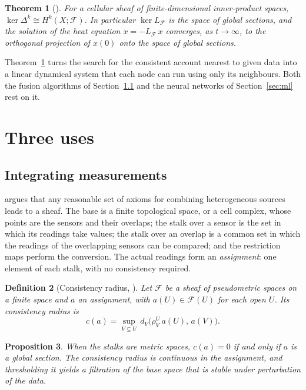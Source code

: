 \documentclass[11pt,a4paper,oneside]{scrartcl}
\theoremstyle{guideplain}
\newtheorem{theorem}{Theorem}[section]
\newtheorem{proposition}[theorem]{Proposition}
\theoremstyle{guidedef}
\newtheorem{definition}[theorem]{Definition}
\newcommand{\F}{\mathcal{F}}
\begin{document}
\begin{theorem}[\cite{hansen2019}]\label{thm:hodge}
  For a cellular sheaf of finite-dimensional inner-product spaces, $\ker\Delta^k\cong H^k(X;\F)$. In
  particular $\ker L_{\F}$ is the space of global sections, and the solution of the heat equation
  $\dot x=-L_{\F}\,x$ converges, as $t\to\infty$, to the orthogonal projection of $x(0)$ onto the space
  of global sections.
\end{theorem}

Theorem~\ref{thm:hodge} turns the search for the consistent account nearest to given data into a
linear dynamical system that each node can run using only its neighbours. Both the fusion algorithms
of Section~\ref{sec:fusion} and the neural networks of Section~\ref{sec:ml} rest on it.

\section{Three uses}\label{sec:uses}

\subsection{Integrating measurements}\label{sec:fusion}

\textcite{robinson2017} argues that any reasonable set of axioms for combining heterogeneous sources
leads to a sheaf. The base is a finite topological space, or a cell complex, whose points are the
sensors and their overlaps; the stalk over a sensor is the set in which its readings take values; the
stalk over an overlap is a common set in which the readings of the overlapping sensors can be
compared; and the restriction maps perform the conversion. The actual readings form an
\emph{assignment}: one element of each stalk, with no consistency required.

\begin{definition}[Consistency radius, \cite{robinson2020}]
  Let $\F$ be a sheaf of pseudometric spaces on a finite space and $a$ an assignment, with
  $a(U)\in\F(U)$ for each open $U$. Its \emph{consistency radius} is
  \[
    c(a)=\sup_{V\subseteq U}\,d_{V}\bigl(\rho^U_V\,a(U),\,a(V)\bigr).
  \]
\end{definition}

\begin{proposition}
  When the stalks are metric spaces, $c(a)=0$ if and only if $a$ is a global section. The consistency
  radius is continuous in the assignment, and thresholding it yields a filtration of the base space
  that is stable under perturbation of the data.
\end{proposition}
\end{document}
